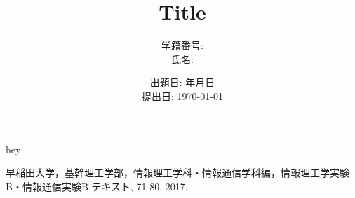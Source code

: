 

\title{Title}
\author{学籍番号: \\氏名: }
\date{出題日: 年月日\\提出日: \today}



\begin{titlepage}
\maketitle
\thispagestyle{empty}
\end{titlepage}

hey

\begin{thebibliography}{1}
   早稲田大学，基幹理工学部，情報理工学科・情報通信学科編，情報理工学実験B・情報通信実験B テキスト, 71-80, 2017.
\end{thebibliography}

%
%
%
%


